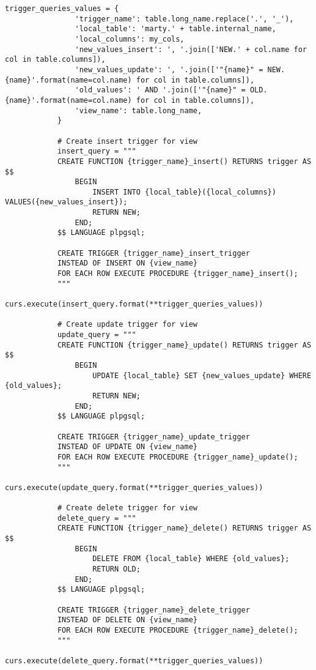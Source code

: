 \begin{lstlisting}[caption={populator.py}]
            trigger_queries_values = {
                'trigger_name': table.long_name.replace('.', '_'),
                'local_table': 'marty.' + table.internal_name,
                'local_columns': my_cols,
                'new_values_insert': ', '.join(['NEW.' + col.name for col in table.columns]),
                'new_values_update': ', '.join(['"{name}" = NEW.{name}'.format(name=col.name) for col in table.columns]),
                'old_values': ' AND '.join(['"{name}" = OLD.{name}'.format(name=col.name) for col in table.columns]),
                'view_name': table.long_name,
            }

            # Create insert trigger for view
            insert_query = """
            CREATE FUNCTION {trigger_name}_insert() RETURNS trigger AS $$
                BEGIN
                    INSERT INTO {local_table}({local_columns}) VALUES({new_values_insert});
                    RETURN NEW;
                END;
            $$ LANGUAGE plpgsql;

            CREATE TRIGGER {trigger_name}_insert_trigger
            INSTEAD OF INSERT ON {view_name}
            FOR EACH ROW EXECUTE PROCEDURE {trigger_name}_insert();
            """
            curs.execute(insert_query.format(**trigger_queries_values))

            # Create update trigger for view
            update_query = """
            CREATE FUNCTION {trigger_name}_update() RETURNS trigger AS $$
                BEGIN
                    UPDATE {local_table} SET {new_values_update} WHERE {old_values};
                    RETURN NEW;
                END;
            $$ LANGUAGE plpgsql;

            CREATE TRIGGER {trigger_name}_update_trigger
            INSTEAD OF UPDATE ON {view_name}
            FOR EACH ROW EXECUTE PROCEDURE {trigger_name}_update();
            """
            curs.execute(update_query.format(**trigger_queries_values))

            # Create delete trigger for view
            delete_query = """
            CREATE FUNCTION {trigger_name}_delete() RETURNS trigger AS $$
                BEGIN
                    DELETE FROM {local_table} WHERE {old_values};
                    RETURN OLD;
                END;
            $$ LANGUAGE plpgsql;

            CREATE TRIGGER {trigger_name}_delete_trigger
            INSTEAD OF DELETE ON {view_name}
            FOR EACH ROW EXECUTE PROCEDURE {trigger_name}_delete();
            """
            curs.execute(delete_query.format(**trigger_queries_values))
\end{lstlisting}